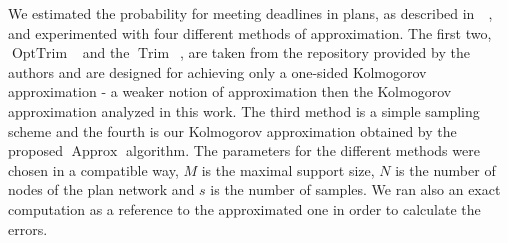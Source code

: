 \documentclass[letterpaper]{article} %
\DeclareMathOperator{\Trim}{Trim}
\DeclareMathOperator{\KlmApprox}{Approx}
\DeclareMathOperator{\OptTrim}{OptTrim}
\begin{document}

We estimated the probability for meeting deadlines in plans, as described in~~\cite{cohen2015estimating,CohenGW18}, and experimented with four different methods of approximation. The first two, $\OptTrim$~\cite{CohenGW18} and the $\Trim$~\cite{cohen2015estimating}, are taken from the repository provided by the authors and are designed for achieving only a one-sided Kolmogorov approximation - a  weaker notion of approximation then the Kolmogorov approximation analyzed in this work. The third method is a simple sampling scheme and the fourth is our Kolmogorov approximation obtained by the proposed $\KlmApprox$ algorithm. The parameters for the different methods were chosen in a compatible way, $M$ is the maximal support size, $N$ is the number of nodes of the plan network and $s$ is the number of samples. We ran also an exact computation as a reference to the approximated one in order to calculate the errors. 
\end{document}
